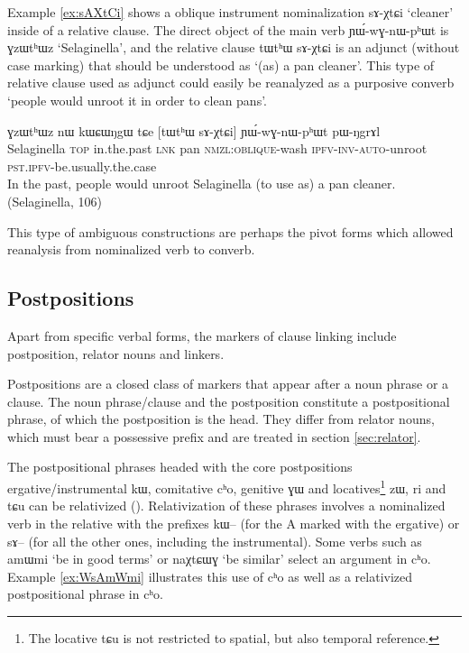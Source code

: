 \documentclass[oldfontcommands,oneside,a4paper,11pt]{article}
\newcommand{\ipa}[1]{{\phon \mbox{#1}}} %
\begin{document}
Example \ref{ex:sAXtCi} shows a oblique instrument nominalization \ipa{sɤ-χtɕi}  `cleaner' inside of a relative clause. The direct object of the main verb   	\ipa{ɲɯ́-wɣ-nɯ-pʰɯt} is \ipa{ɣzɯtʰɯz} `Selaginella', and the relative clause \ipa{tɯtʰɯ}  	\ipa{sɤ-χtɕi}  is an adjunct (without case marking) that should be understood as `(as) a pan cleaner'. This type of relative clause used as adjunct could easily be reanalyzed as a purposive converb `people would unroot it in order to clean pans'.

\begin{exe}
\ex \label{ex:sAXtCi}
\gll
\ipa{ɣzɯtʰɯz}  	\ipa{nɯ}  	\ipa{kɯɕɯŋgɯ}  	\ipa{tɕe}  	[\ipa{tɯtʰɯ}  	\ipa{sɤ-χtɕi}]  	\ipa{ɲɯ́-wɣ-nɯ-pʰɯt}  	\ipa{pɯ-ŋgrɤl}  \\
Selaginella \textsc{top} in.the.past \textsc{lnk} pan \textsc{nmzl:oblique}-wash \textsc{ipfv-inv-auto}-unroot \textsc{pst.ipfv}-be.usually.the.case \\
\glt In the past, people would unroot Selaginella (to use as) a pan cleaner. (Selaginella, 106)
\end{exe}

This type of ambiguous constructions are perhaps the pivot forms which allowed reanalysis from nominalized verb to converb.

\subsection{Postpositions}  \label{sec:postp}
Apart from specific verbal forms, the markers of clause linking include postposition, relator nouns and linkers.


Postpositions are a closed class of markers that appear after a noun phrase or a clause. The noun phrase/clause and the postposition constitute a postpositional phrase, of which the postposition is the head. They differ from relator nouns, which must bear a possessive prefix and are treated in section \ref{sec:relator}.  

The   postpositional phrases headed with the core postpositions  ergative/instrumental \ipa{kɯ}, comitative \ipa{cʰo}, genitive \ipa{ɣɯ} and  locatives\footnote{The locative \ipa{tɕu} is not restricted to spatial, but also temporal reference. } \ipa{zɯ}, \ipa{ri} and \ipa{tɕu} can be relativized  (\citealt{jacques14relatives}). Relativization of these phrases involves a nominalized verb in the relative with the prefixes \ipa{kɯ--} (for the A marked with the ergative) or \ipa{sɤ--} (for all the other ones, including the instrumental). Some verbs  such as \ipa{amɯmi} `be in good terms' or \ipa{naχtɕɯɣ} `be similar' select an argument in \ipa{cʰo}. Example \ref{ex:WsAmWmi} illustrates this use of \ipa{cʰo} as well as a relativized postpositional phrase in \ipa{cʰo}.
\end{document}
